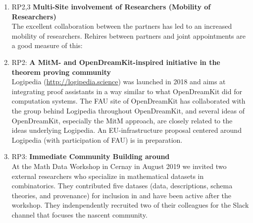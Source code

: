 \begin{enumerate}
\item RP2,3 \textbf{Multi-Site involvement of Researchers (Mobility of Researchers)}\\
  The excellent collaboration between the \ODK partners has led to an
  increased mobility of researchers. Rehires between partners and
  joint appointments are a good measure of this:
\item RP2: \textbf{A MitM- and OpenDreamKit-inspired initiative in the theorem proving community}\\
  Logipedia (\url {http://logipedia.science}) was launched in 2018 and aims at integrating proof assistants in a way similar to what OpenDreamKit did for computation systems.
  The FAU site of OpenDreamKit has collaborated with the group behind Logipedia throughout OpenDreamKit, and several ideas of OpenDreamKit, especially the MitM approach, are closely related to the ideas underlying Logipedia.
  An EU-infrastructure proposal centered around Logipedia (with participation of FAU) is in preparation.
\item RP3: \textbf{Immediate Community Building around \dmh}\\
    At the Math Data Workshop in Cernay in August 2019  we invited two external
    researchers who specialize in mathematical datasets in combinatorics. They contributed
    five datases (data, descriptions, schema theories, and provenance) for inclusion in
    \dmh and have been active after the workshop. They indenpendently recruited two of
    their colleagues for the Slack channel that focuses the nascent community. 
\end{enumerate}

